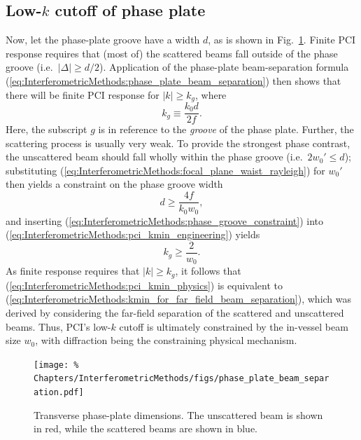 \subsection{Low-$k$ cutoff of phase plate}
Now, let the phase-plate groove have a width $d$, as is shown in
Fig.~\ref{fig:InterferometricMethods:phase_plate_beam_separation}.
Finite PCI response requires that (most of) the scattered beams
fall outside of the phase groove (i.e.\ $|\Delta| \geq d / 2$).
Application of the phase-plate beam-separation formula
(\ref{eq:InterferometricMethods:phase_plate_beam_separation})
then shows that there will be finite PCI response
for $|k| \geq k_g$, where
\begin{equation}
  k_g \equiv \frac{k_0 d}{2 f}.
  \label{eq:InterferometricMethods:pci_kmin_engineering}
\end{equation}
Here, the subscript $g$ is in reference
to the \emph{groove} of the phase plate.
Further, the scattering process is usually very weak.
To provide the strongest phase contrast,
the unscattered beam should fall wholly within the phase groove
(i.e.\ $2 w_0' \leq d$);
substituting (\ref{eq:InterferometricMethods:focal_plane_waist_rayleigh})
for $w_0'$ then yields a constraint on the phase groove width
\begin{equation}
  d \geq \frac{4 f}{k_0 w_0},
  \label{eq:InterferometricMethods:phase_groove_constraint}
\end{equation}
and inserting (\ref{eq:InterferometricMethods:phase_groove_constraint}) into
(\ref{eq:InterferometricMethods:pci_kmin_engineering}) yields
\begin{equation}
  k_g \geq \frac{2}{w_0}.
  \label{eq:InterferometricMethods:pci_kmin_physics}
\end{equation}
As finite response requires that $|k| \geq k_g$, it follows that
(\ref{eq:InterferometricMethods:pci_kmin_physics}) is equivalent to
(\ref{eq:InterferometricMethods:kmin_for_far_field_beam_separation}),
which was derived by considering the far-field separation
of the scattered and unscattered beams.
Thus, PCI's low-$k$ cutoff
is ultimately constrained by the in-vessel beam size $w_0$,
with diffraction being the constraining physical mechanism.

\begin{figure}
  \centering
  \texttt{[image: \%
    Chapters/InterferometricMethods/figs/phase\_plate\_beam\_separation.pdf]}
  \caption[Transverse phase-plate dimensions]{%
    Transverse phase-plate dimensions.
    The unscattered beam is shown in red, while
    the scattered beams are shown in blue.}
  \label{fig:InterferometricMethods:phase_plate_beam_separation}
\end{figure}



